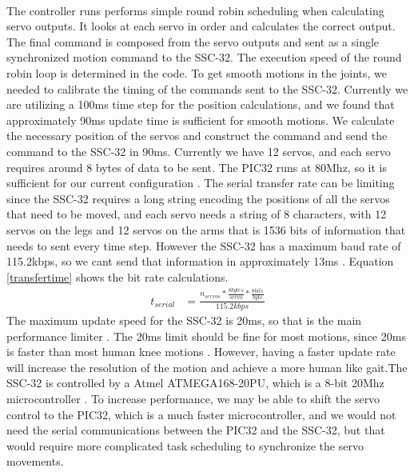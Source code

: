 \documentclass[titlepage,letterpaper,12pt]{article}
\begin{document}
\paragraph{}The controller runs performs simple round robin scheduling when
calculating servo outputs. It looks at each servo in order and calculates the
correct output. The final command is composed from the servo outputs and sent as
a single synchronized motion command to the SSC-32. The execution speed of the
round robin loop is determined in the code. To get smooth motions in the joints,
we needed to calibrate the timing of the commands sent to the SSC-32. Currently
we are utilizing a 100ms time step for the position calculations, and we found
that approximately 90ms update time is sufficient for smooth motions. We
calculate the necessary position of the servos and construct the command and
send the command to the SSC-32 in 90ms. Currently we have 12 servos, and each
servo requires around 8 bytes of data to be sent.  The PIC32 runs at 80Mhz, so
it is sufficient for our current configuration \cite{pic32data}. The serial
transfer rate can be limiting since the SSC-32 requires a long string encoding
the positions of all the servos that need to be moved, and each servo needs a
string of 8 characters, with 12 servos on the legs and 12 servos on the arms
that is 1536 bits of information that needs to sent every time step. However the
SSC-32 has a maximum baud rate of 115.2kbps, so we cant send that information in
approximately 13ms \cite{sscdata}. Equation \ref{transfertime} shows the bit
rate calculations.
\begin{align}
    t_{serial} &= \frac{n_{servos} * \frac{8 bytes}{servo} * \frac{8 bits}{byte}}
        {115.2 kbps} \label{transfertime}
\end{align}
The maximum update speed for the SSC-32 is 20ms, so that is the main performance
limiter \cite{lynxmaxspeed}.  The 20ms limit should be fine for most motions,
since 20ms is faster than most human knee motions
\cite{williamson2001detecting}. However, having a faster update rate will
increase the resolution of the motion and achieve a more human like gait.The
SSC-32 is controlled by a Atmel ATMEGA168-20PU, which is a 8-bit 20Mhz
microcontroller \cite{Atmega168data}. To increase performance, we may be able
to shift the servo control to the PIC32, which is a much faster microcontroller,
and we would not need the serial communications between the PIC32 and the
SSC-32, but that would require more complicated task scheduling to synchronize
the servo movements.
\end{document}
